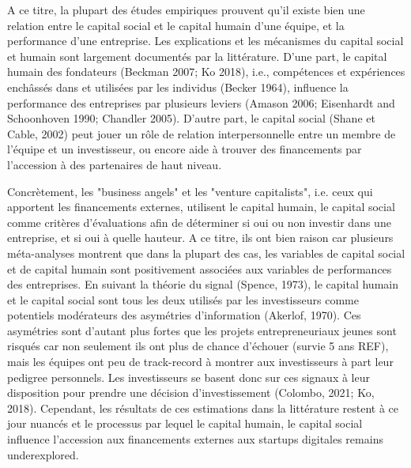 \documentclass[11pt]{article}
\begin{document}
A ce titre, la plupart des études empiriques prouvent qu'il existe bien une relation entre le capital social et le capital humain d'une équipe, et la performance d'une entreprise. Les explications et les mécanismes du capital social et humain sont largement documentés par la littérature. D'une part, le capital humain des fondateurs (Beckman 2007; Ko 2018), i.e., compétences et expériences enchâssés dans et utilisées par les individus (Becker 1964), influence la performance des entreprises par plusieurs leviers (Amason 2006; Eisenhardt and Schoonhoven 1990; Chandler 2005). D'autre part, le capital social (Shane et Cable, 2002) peut jouer un rôle de relation interpersonnelle entre un membre de l'équipe et un investisseur, ou encore aide à trouver des financements par l'accession à des partenaires de haut niveau.

Concrètement, les "business angels" et les "venture capitalists", i.e. ceux qui apportent les financements externes, utilisent le capital humain, le capital social comme critères d'évaluations afin de déterminer si oui ou non investir dans une entreprise, et si oui à quelle hauteur. A ce titre, ils ont bien raison car plusieurs méta-analyses montrent que dans la plupart des cas, les variables de capital social et de capital humain sont positivement associées aux variables de performances des entreprises. En suivant la théorie du signal (Spence, 1973), le capital humain et le capital social sont tous les deux utilisés par les investisseurs comme potentiels modérateurs des asymétries d'information (Akerlof, 1970). Ces asymétries sont d'autant plus fortes que les projets entrepreneuriaux jeunes sont risqués car non seulement ils ont plus de chance d'échouer (survie 5 ans REF), mais les équipes ont peu de track-record à montrer aux investisseurs à part leur pedigree personnels. Les investisseurs se basent donc sur ces signaux à leur disposition pour prendre une décision d'investissement (Colombo, 2021; Ko, 2018). Cependant, les résultats de ces estimations dans la littérature restent à ce jour nuancés et le processus par lequel le capital humain, le capital social influence l'accession aux financements externes aux startups digitales remains underexplored.
\end{document}
